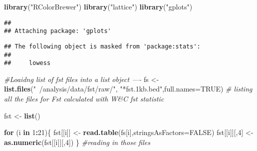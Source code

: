 \documentclass[]{article}
\newenvironment{Shaded}{\begin{snugshade}}{\end{snugshade}}
\newcommand{\KeywordTok}[1]{\textcolor[rgb]{0.13,0.29,0.53}{\textbf{#1}}}
\newcommand{\DataTypeTok}[1]{\textcolor[rgb]{0.13,0.29,0.53}{#1}}
\newcommand{\DecValTok}[1]{\textcolor[rgb]{0.00,0.00,0.81}{#1}}
\newcommand{\StringTok}[1]{\textcolor[rgb]{0.31,0.60,0.02}{#1}}
\newcommand{\CommentTok}[1]{\textcolor[rgb]{0.56,0.35,0.01}{\textit{#1}}}
\newcommand{\OtherTok}[1]{\textcolor[rgb]{0.56,0.35,0.01}{#1}}
\newcommand{\ControlFlowTok}[1]{\textcolor[rgb]{0.13,0.29,0.53}{\textbf{#1}}}
\newcommand{\OperatorTok}[1]{\textcolor[rgb]{0.81,0.36,0.00}{\textbf{#1}}}
\newcommand{\NormalTok}[1]{#1}
\begin{document}
\begin{Shaded}
\begin{Highlighting}[]
\KeywordTok{library}\NormalTok{(}\StringTok{"RColorBrewer"}\NormalTok{)}
\KeywordTok{library}\NormalTok{(}\StringTok{"lattice"}\NormalTok{)}
\KeywordTok{library}\NormalTok{(}\StringTok{"gplots"}\NormalTok{)}
\end{Highlighting}
\end{Shaded}

\begin{verbatim}
## 
## Attaching package: 'gplots'
\end{verbatim}

\begin{verbatim}
## The following object is masked from 'package:stats':
## 
##     lowess
\end{verbatim}

\begin{Shaded}
\begin{Highlighting}[]
\CommentTok{#Loaidng list of fst files into a list object ----}
\NormalTok{fs <-}\StringTok{ }\KeywordTok{list.files}\NormalTok{(}\StringTok{"~/analysis/data/fst/raw/"}\NormalTok{, }\StringTok{"*fst.1kb.bed"}\NormalTok{,}\DataTypeTok{full.names=}\OtherTok{TRUE}\NormalTok{) }\CommentTok{# listing all the files for Fst calculated with W&C fst statistic}

\NormalTok{fst <-}\StringTok{ }\KeywordTok{list}\NormalTok{()}

\ControlFlowTok{for}\NormalTok{ (i }\ControlFlowTok{in} \DecValTok{1}\OperatorTok{:}\DecValTok{21}\NormalTok{)\{}
\NormalTok{    fst[[i]] <-}\StringTok{ }\KeywordTok{read.table}\NormalTok{(fs[i],}\DataTypeTok{stringsAsFactors=}\OtherTok{FALSE}\NormalTok{)}
\NormalTok{    fst[[i]][,}\DecValTok{4}\NormalTok{] <-}\StringTok{ }\KeywordTok{as.numeric}\NormalTok{(fst[[i]][,}\DecValTok{4}\NormalTok{])}
\NormalTok{\} }\CommentTok{#reading in those files}
\end{Highlighting}
\end{Shaded}
\end{document}
